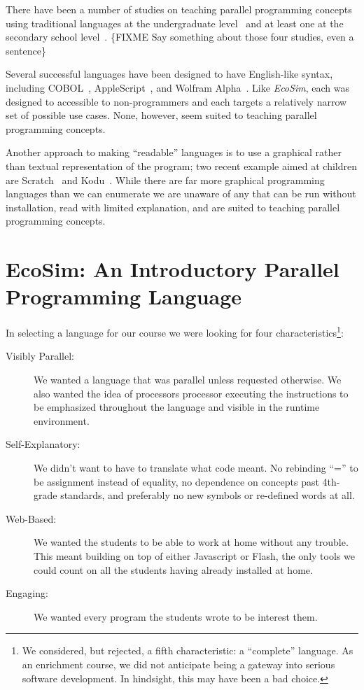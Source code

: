 \documentclass{sig-alternate}
\newcommand{\FIXME}[1]{{\color{red}\{FIXME #1\}}}
\newcommand{\EcoSim}{\emph{EcoSim}}
\begin{document}
There have been a number of studies on teaching 
parallel programming concepts using traditional languages at the 
undergraduate level~\cite{freshmanParallel,undergraduateParallel,gridPortal} 
and at least one at the secondary school level~\cite{highSchoolParallel}.
\FIXME{Say something about those four studies, even a sentence}

Several successful languages have been designed to have English-like syntax,
including COBOL~\cite{COBOL59}, AppleScript~\cite{AppleScript}, and Wolfram Alpha~\cite{WolframAlpha}.
Like \EcoSim{}, each was designed to accessible to non-programmers
and each targets a relatively narrow set of possible use cases.
None, however, seem suited to teaching parallel programming concepts.

Another approach to making ``readable'' languages 
is to use a graphical rather than textual representation of the program;
two recent example aimed at children are Scratch~\cite{Scratch} and Kodu~\cite{Kodu}.
While there are far more graphical programming languages than we can enumerate
we are unaware of any that can be run without installation, 
read with limited explanation, and are suited to teaching parallel programming concepts.



\section{EcoSim: An Introductory Parallel Programming Language}
In selecting a language for our course we were looking for four characteristics\footnote{
We considered, but rejected, a fifth characteristic: a ``complete'' language.
As an enrichment course, we did not anticipate being a gateway into serious software development.
In hindsight, this may have been a bad choice.
}:
\begin{description}
	\item[Visibly Parallel:]
		We wanted a language that was parallel unless requested otherwise.
		We also wanted the idea of processors processor executing the instructions
		to be emphasized throughout the language and visible in the runtime environment.
	\item[Self-Explanatory:]
		We didn't want to have to translate what code meant.
		No rebinding ``='' to be assignment instead of equality,
		no dependence on concepts past 4th-grade standards,
		and preferably no new symbols or re-defined words at all.
	\item[Web-Based:]
		We wanted the students to be able to work at home without any trouble.
		This meant building on top of either Javascript or Flash, 
		the only tools we could count on all the students having already installed at home.
	\item[Engaging:]
		We wanted every program the students wrote to be interest them.
\end{description}
\end{document}
